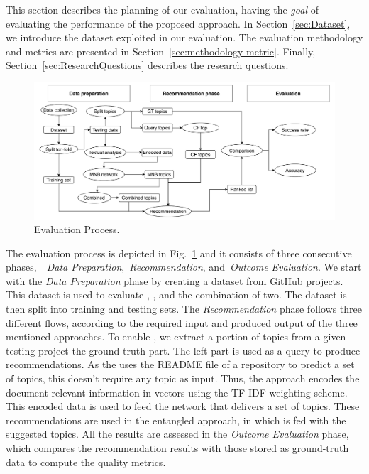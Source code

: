 





This section describes the planning of our evaluation, having the {\em goal} of evaluating the performance of the proposed approach. In Section~\ref{sec:Dataset}, we introduce the dataset exploited in our evaluation. The evaluation methodology and metrics are presented in Section~\ref{sec:methodology-metric}. Finally, Section~\ref{sec:ResearchQuestions} describes the research questions.



\begin{figure}[h!]
	\centering
	\includegraphics[width=\linewidth]{figs/evaluationCF.pdf}
	\caption{Evaluation Process.}
	\label{fig:EvaluationProcess}
	\vspace{-.3cm}
\end{figure}

The evaluation process is depicted in Fig.~\ref{fig:EvaluationProcess} and it consists of three consecutive phases,~\ie~\emph{Data Preparation},~\emph{Recommendation}, and~\emph{Outcome Evaluation}. We start with the \emph{Data Preparation} phase by creating a dataset from GitHub projects. This dataset is used to evaluate \CT, \MNB, and the combination of two. 
 The dataset is then split into training and testing sets. The 
\emph{Recommendation} phase follows three different flows, according to the required input and produced output of the three mentioned approaches. To enable \CT, we extract a portion of topics from a given testing project \ie the ground-truth part. The left part is used as a query to produce recommendations. As the \MNB uses the README file of a repository to predict a set of topics, this doesn't require any topic as input. Thus, the approach encodes the document relevant information in vectors using the TF-IDF weighting scheme. This encoded data is used to feed the network that delivers a set of topics. These recommendations are used in the entangled approach, in which \CT is fed with the \MNB suggested topics. All the results are assessed in the \emph{Outcome Evaluation} phase, which compares the recommendation results with those stored as ground-truth data to compute the quality metrics. 


